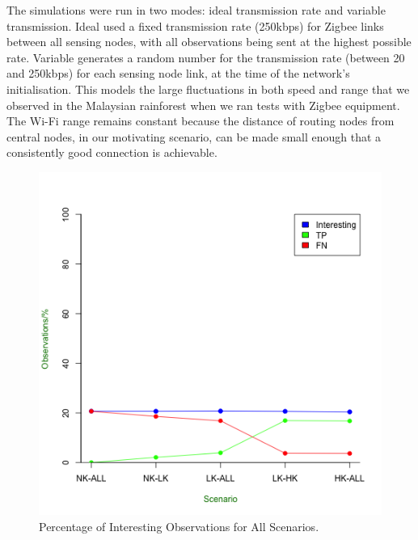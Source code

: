The simulations were run in two modes: ideal transmission rate and variable transmission. Ideal used a fixed transmission rate (250kbps) for Zigbee links between all sensing nodes, with all observations being sent at the highest possible rate. Variable generates a random number for the transmission rate (between 20 and 250kbps) for each sensing node link, at the time of the network's initialisation. This models the large fluctuations in both speed and range that we observed in the Malaysian rainforest when we ran tests with Zigbee equipment. The Wi-Fi range remains constant because the distance of routing nodes from central nodes, in our motivating scenario, can be made small enough that a consistently good connection is achievable.

\begin{figure}[h]
	\centering
	\includegraphics[width=\textwidth]{Chap7/figures/ideal_int_percent}
	\caption{Percentage of Interesting Observations for All Scenarios.}
	\label{fig:res:ideal:int}
\end{figure}

